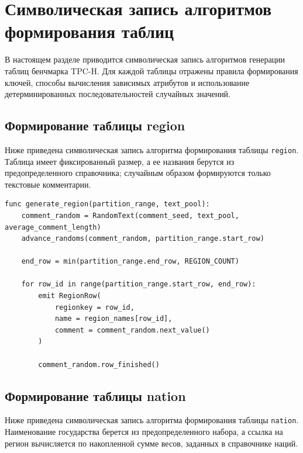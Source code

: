 \section{Символическая запись алгоритмов формирования таблиц}

В настоящем разделе приводится символическая запись алгоритмов генерации
таблиц бенчмарка TPC-H. Для каждой таблицы отражены правила формирования ключей,
способы вычисления зависимых атрибутов и использование детерминированных
последовательностей случайных значений.

\subsection{Формирование таблицы region}

Ниже приведена символическая запись алгоритма формирования таблицы
\texttt{region}. Таблица имеет фиксированный размер, а ее названия берутся из
предопределенного справочника; случайным образом формируются только
текстовые комментарии.

\begin{lstlisting}[caption={Формирование таблицы region}]
func generate_region(partition_range, text_pool):
    comment_random = RandomText(comment_seed, text_pool, average_comment_length)
    advance_randoms(comment_random, partition_range.start_row)

    end_row = min(partition_range.end_row, REGION_COUNT)

    for row_id in range(partition_range.start_row, end_row):
        emit RegionRow(
            regionkey = row_id,
            name = region_names[row_id],
            comment = comment_random.next_value()
        )

        comment_random.row_finished()
\end{lstlisting}

\subsection{Формирование таблицы nation}

Ниже приведена символическая запись алгоритма формирования таблицы
\texttt{nation}. Наименование государства берется из предопределенного набора, а
ссылка на регион вычисляется по накопленной сумме весов, заданных в
справочнике наций.

